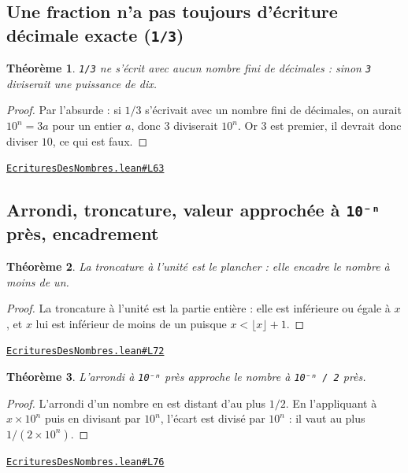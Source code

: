 \documentclass[11pt,a4paper]{article}
\theoremstyle{definition}
\theoremstyle{plain}
\newtheorem{theoreme}{Théorème}
\newcommand{\source}[2]{\par\smallskip\noindent\hfill{\footnotesize\href{#1}{\texttt{#2}}}\par\smallskip}
\begin{document}
\subsection{Une fraction n'a pas toujours d'écriture décimale exacte (\texttt{1/3})}

\begin{theoreme}
\texttt{1/3} ne s'écrit avec aucun nombre fini de décimales : sinon \texttt{3} diviserait une
puissance de dix.
\end{theoreme}

\begin{proof}
Par l'absurde : si $1/3$ s'écrivait avec un nombre fini de décimales, on aurait
$10^n = 3a$ pour un entier $a$, donc $3$ diviserait $10^n$. Or $3$ est premier, il devrait
donc diviser $10$, ce qui est faux.
\end{proof}
\source{https://github.com/Commutator-IO/learn-lean/blob/main/courses/01-college/01-nombres-et-calculs/EcrituresDesNombres.lean\#L63}{EcrituresDesNombres.lean\#L63}

\subsection{Arrondi, troncature, valeur approchée à \texttt{10⁻ⁿ} près, encadrement}

\begin{theoreme}
La troncature à l'unité est le plancher : elle encadre le nombre à moins de un.
\end{theoreme}

\begin{proof}
La troncature à l'unité est la partie entière : elle est inférieure ou égale à $x$,
et $x$ lui est inférieur de moins de un puisque $x < \lfloor x \rfloor + 1$.
\end{proof}
\source{https://github.com/Commutator-IO/learn-lean/blob/main/courses/01-college/01-nombres-et-calculs/EcrituresDesNombres.lean\#L72}{EcrituresDesNombres.lean\#L72}

\begin{theoreme}
L'arrondi à \texttt{10⁻ⁿ} près approche le nombre à \texttt{10⁻ⁿ / 2} près.
\end{theoreme}

\begin{proof}
L'arrondi d'un nombre en est distant d'au plus $1/2$. En l'appliquant à
$x \times 10^n$ puis en divisant par $10^n$, l'écart est divisé par $10^n$ : il vaut au plus
$1/(2 \times 10^n)$.
\end{proof}
\source{https://github.com/Commutator-IO/learn-lean/blob/main/courses/01-college/01-nombres-et-calculs/EcrituresDesNombres.lean\#L76}{EcrituresDesNombres.lean\#L76}
\end{document}
